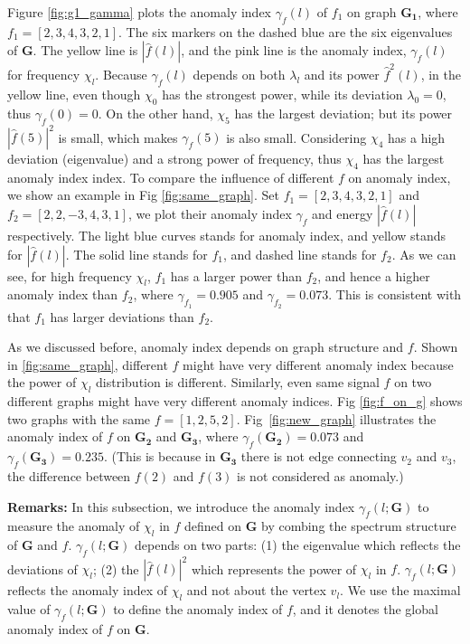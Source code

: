 \documentclass[conference]{IEEEtran}
\begin{document}
Figure \ref{fig:g1_gamma} plots the anomaly index $\gamma_f(l)$ of $f_1$ on graph $\mathbf{G_1}$, where $f_1=[2,3,4,3,2,1]$. The six markers on the dashed blue are the six eigenvalues of $\mathbf{G}$. The yellow line is $|\hat{f}(l)|$, and the pink line is the anomaly index, $\gamma_f(l)$ for frequency $\chi_l$. Because $\gamma_f(l)$ depends on both $\lambda_l$ and its power $\hat{f}^2(l)$, in the yellow line, even though $\chi_0$ has the strongest power,  while its deviation $\lambda_0 = 0$, thus  $\gamma_f(0)=0$. On the other hand, $\chi_5$ has the largest deviation; but its power $|\hat{f}(5)|^2$ is small, which makes $\gamma_f(5)$ is also small. Considering $\chi_4$ has a high deviation (eigenvalue) and a strong power of frequency, thus $\chi_4$  has the largest anomaly index index. To compare the influence of different $f$ on anomaly index, we show an example in Fig \ref{fig:same_graph}. Set $f_1=[2,3,4,3,2,1]$ and $f_2=[2,2,-3,4,3,1]$, we plot their anomaly index $\gamma_{f}$ and energy $|\hat{f}(l)|$ respectively.
The light blue curves stands for anomaly index, and yellow stands for $|\hat{f}(l)|$. The solid line stands for $f_1$, and dashed line stands for $f_2$. As we can see, for high frequency $\chi_l$, $f_1$ has a larger power than $f_2$, and hence a higher anomaly index than $f_2$, where $\gamma_{f_1}=0.905$ and $\gamma_{f_2}=0.073$. This is consistent with that $f_1$ has larger deviations than $f_2$.

 As we discussed before, anomaly index depends on graph structure and $f$. Shown in \ref{fig:same_graph}, different $f$ might have very different anomaly index because the power of $\chi_l$ distribution is different. Similarly, even same signal $f$ on two different graphs might have very different anomaly indices. Fig \ref{fig:f_on_g} shows two graphs with the same $f=[1,2,5,2]$. Fig~\ref{fig:new_graph} illustrates the anomaly index of $f$ on $\mathbf{G_2}$ and $\mathbf{G_3}$, where $\gamma_{f}(\mathbf{G_2})=0.073$ and $\gamma_{f}(\mathbf{G_3})=0.235$. (This is because in $\mathbf{G_3}$ there is not edge connecting $v_2$ and $v_3$, the difference between $f(2)$ and $f(3)$ is not considered as anomaly.)


{\textbf{Remarks:}}
In this subsection, we introduce the anomaly index $\gamma_f(l;\mathbf{G})$ to measure the anomaly of $\chi_l$ in $f$ defined on $\mathbf{G}$ by combing the spectrum structure of $\mathbf{G}$ and $f$. $\gamma_f(l;\mathbf{G})$ depends on two parts: (1) the eigenvalue which reflects the deviations of $\chi_l$; (2) the $|\hat{f}(l)|^2$  which represents the power of $\chi_l$ in $f$. $\gamma_f(l;\mathbf{G})$ reflects the anomaly index of $\chi_l$ and not about the vertex $v_l$. We use the maximal value of $\gamma_f(l;\mathbf{G})$ to define the anomaly index of $f$, and it denotes the global anomaly index of $f$ on $\mathbf{G}$.
\end{document}
